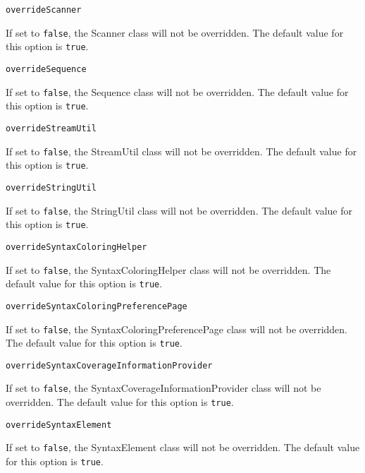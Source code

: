 \noindent\texttt{overrideScanner}
\begin{myindentpar}{1cm}
If set to \texttt{false}, the Scanner class will not be overridden. The default value for this option is \texttt{true}.
\end{myindentpar}

\noindent\texttt{overrideSequence}
\begin{myindentpar}{1cm}
If set to \texttt{false}, the Sequence class will not be overridden. The default value for this option is \texttt{true}.
\end{myindentpar}

\noindent\texttt{overrideStreamUtil}
\begin{myindentpar}{1cm}
If set to \texttt{false}, the StreamUtil class will not be overridden. The default value for this option is \texttt{true}.
\end{myindentpar}

\noindent\texttt{overrideStringUtil}
\begin{myindentpar}{1cm}
If set to \texttt{false}, the StringUtil class will not be overridden. The default value for this option is \texttt{true}.
\end{myindentpar}

\noindent\texttt{overrideSyntaxColoringHelper}
\begin{myindentpar}{1cm}
If set to \texttt{false}, the SyntaxColoringHelper class will not be overridden. The default value for this option is \texttt{true}.
\end{myindentpar}

\noindent\texttt{overrideSyntaxColoringPreferencePage}
\begin{myindentpar}{1cm}
If set to \texttt{false}, the SyntaxColoringPreferencePage class will not be overridden. The default value for this option is \texttt{true}.
\end{myindentpar}

\noindent\texttt{overrideSyntaxCoverageInformationProvider}
\begin{myindentpar}{1cm}
If set to \texttt{false}, the SyntaxCoverageInformationProvider class will not be overridden. The default value for this option is \texttt{true}.
\end{myindentpar}

\noindent\texttt{overrideSyntaxElement}
\begin{myindentpar}{1cm}
If set to \texttt{false}, the SyntaxElement class will not be overridden. The default value for this option is \texttt{true}.
\end{myindentpar}

